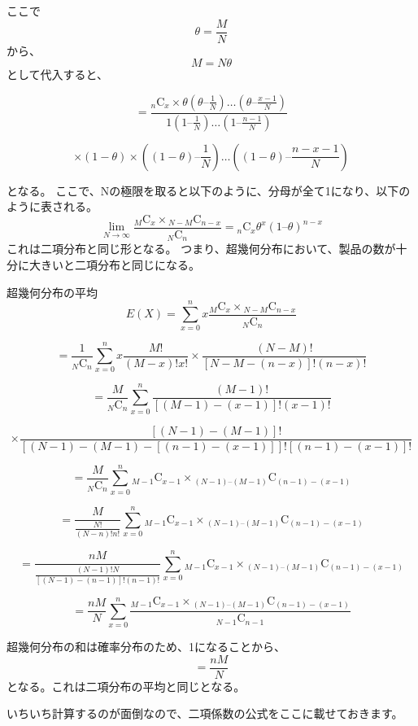 \documentclass[]{article}
\begin{document}
ここで \[ \theta = \frac{M}{N}\] から、 \[ M = N\theta\]
として代入すると、

\[ = \frac{{}_n \mathrm{C} _x \times \theta \left( \theta – \frac{1}{N} \right) \dots \left( \theta – \frac{x-1}{N} \right) }{1 \left( 1 – \frac{1}{N} \right) \dots \left( 1 – \frac{n-1}{N} \right) } \]

\[ \times \left( 1-\theta \right) \times \left( (1-\theta) – \frac{1}{N} \right) \dots \left( (1-\theta) – \frac{n-x-1}{N} \right) \]

となる。
ここで、Nの極限を取ると以下のように、分母が全て1になり、以下のように表される。
\[ \lim_{N\to\infty}\frac{{}_M \mathrm{C} _x \times {}_{N-M} \mathrm{C} _{n-x}}{{}_N \mathrm{C} _n} = {}_n \mathrm{C} _x \theta^x \left( 1 – \theta \right)^{n-x} \]
これは二項分布と同じ形となる。
つまり、超幾何分布において、製品の数が十分に大きいと二項分布と同じになる。

超幾何分布の平均
\[ E(X) = \sum_{x=0}^{n} x \frac{ {}_M \mathrm{C} _x \times {}_{N-M} \mathrm{C} _{n-x}}{{}_N \mathrm{C} _n} \]

\[ = \frac{1}{ {}_N \mathrm{C} _n } \sum_{x=0}^{n} x \frac{M!}{(M-x)!x!} \times \frac{(N-M)!}{ \left[ N-M-(n-x) \right]! (n-x)!}\]

\[ = \frac{M}{ {}_N \mathrm{C} _n} \sum_{x=0}^{n} \frac{(M-1)!}{\left[ (M-1)-(x-1) \right]!(x-1)!} \]

\[ \times \frac{\left[ (N-1)-(M-1) \right]!}{\left[ (N-1)-(M-1)-\left[(n-1)-(x-1)\right] \right]! \left[ (n-1)-(x-1) \right]!}\]

\[ = \frac{M}{ {}_N \mathrm{C} _n} \sum_{x=0}^{n} {}_{M-1} \mathrm{C} _{x-1} \times {}_{(N-1) – (M-1)} \mathrm{C} _{(n-1)-(x-1)} \]

\[ = \frac{M}{ \frac{N!}{(N-n)!n!} } \sum_{x=0}^{n} {}_{M-1} \mathrm{C} _{x-1} \times {}_{(N-1) – (M-1)} \mathrm{C} _{(n-1)-(x-1)} \]

\[ = \frac{nM}{ \frac{(N-1)!N}{\left[ (N-1)-(n-1)\right]!(n-1)!} } \sum_{x=0}^{n} {}_{M-1} \mathrm{C} _{x-1} \times {}_{(N-1) – (M-1)} \mathrm{C} _{(n-1)-(x-1)} \]

\[ = \frac{nM}{N} \sum_{x=0}^{n} \frac{ {}_{M-1} \mathrm{C} _{x-1} \times {}_{(N-1) – (M-1)} \mathrm{C} _{(n-1)-(x-1)} }{ {}_{N-1} \mathrm{C} _{n-1} } \]

超幾何分布の和は確率分布のため、1になることから、 \[ = \frac{nM}{N}\]
となる。これは二項分布の平均と同じとなる。

いちいち計算するのが面倒なので、二項係数の公式をここに載せておきます。
\end{document}
